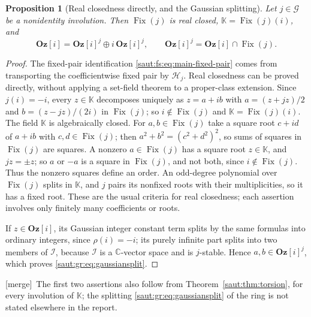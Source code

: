 \documentclass[11pt]{article}
\newtheorem{proposition}[theorem]{Proposition}
\theoremstyle{definition}
\theoremstyle{remark}
\newcommand{\C}{\mathbb C}
\newcommand{\K}{\mathbb K}
\newcommand{\Fix}{\operatorname{Fix}}
\newcommand{\Oz}{\mathbf{Oz}}
\newcommand{\Ineg}{\mathcal I}
\newcommand{\mergetag}{\textup{[merge]}}
\numberwithin{equation}{section}
\begin{document}
\begin{proposition}[Real closedness directly, and the Gaussian splitting]\label{saut:gr:prop:split}
Let $j\in\mathcal G$ be a nonidentity involution. Then $\Fix(j)$ is real closed,
$\K=\Fix(j)(i)$, and
\begin{equation}\label{saut:gr:eq:gaussiansplit}
 \Oz[i]=\Oz[i]^j\oplus i\,\Oz[i]^j,\qquad \Oz[i]^j=\Oz[i]\cap\Fix(j).
\end{equation}
\end{proposition}
\begin{proof}
The fixed-pair identification \eqref{saut:fs:eq:main-fixed-pair} comes from transporting
the coefficientwise fixed pair by $\mathcal H_j$. Real closedness can be proved
directly, without applying a set-field theorem to a proper-class extension. Since
$j(i)=-i$, every $z\in\K$ decomposes uniquely as $z=a+ib$ with
$a=(z+jz)/2$ and $b=(z-jz)/(2i)$ in $\Fix(j)$; so $i\notin\Fix(j)$ and $\K=\Fix(j)(i)$.
The field $\K$ is algebraically closed. For $a,b\in\Fix(j)$ take a square root $c+id$
of $a+ib$ with $c,d\in\Fix(j)$; then $a^2+b^2=(c^2+d^2)^2$, so sums of squares in
$\Fix(j)$ are squares. A nonzero $a\in\Fix(j)$ has a square root $z\in\K$, and
$jz=\pm z$; so $a$ or $-a$ is a square in $\Fix(j)$, and not both, since $i\notin\Fix(j)$.
Thus the nonzero squares define an order. An odd-degree polynomial over $\Fix(j)$ splits
in $\K$, and $j$ pairs its nonfixed roots with their multiplicities, so it has a fixed
root. These are the usual criteria for real closedness; each assertion involves only
finitely many coefficients or roots.

If $z\in\Oz[i]$, its Gaussian integer constant term splits by the same formulas into
ordinary integers, since $\rho(i)=-i$; its purely infinite part splits into two
members of $\Ineg$, because $\Ineg$ is a $\C$-vector space and is $j$-stable. Hence
$a,b\in\Oz[i]^j$, which proves \eqref{saut:gr:eq:gaussiansplit}.
\end{proof}

\mergetag\ The first two assertions also follow from Theorem~\ref{saut:thm:torsion},
for every involution of $\K$; the splitting \eqref{saut:gr:eq:gaussiansplit} of the ring
is not stated elsewhere in the report.
\end{document}
